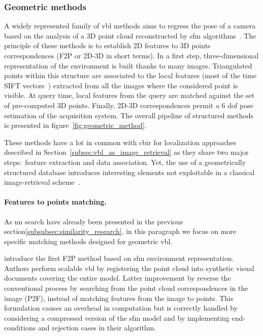 \subsubsection{Geometric methods}


\label{subsubsec:sfm_methods}
A widely represented family of \ac{vbl} methods aims to regress the pose of a camera based on the analysis of a 3D point cloud reconstructed by \ac{sfm} algorithms~\citep{schoenberger2016sfm,moulon2016openmvg,rupnik2017micmac}. The principle of these methods is to establish 2D features to 3D points correspondences (F2P or 2D-3D in short terms). In a first step, three-dimensional representation of the environment is built thanks to many images. Triangulated points within this structure are associated to the local features (most of the time SIFT vectors~\citep{Lowe2004}) extracted from all the images where the considered point is visible. At query time, local features from the query are matched against the set of pre-computed 3D points. Finally, 2D-3D correspondences permit a 6 \ac{dof} pose estimation of the acquisition system. The overall pipeline of structured methods is presented in figure~\ref{fig:geometric_method}.

These methods have a lot in common with \ac{cbir} for localization approaches described in Section~\ref{subsec:vbl_as_image_retrieval} as they share two major steps:~feature extraction and data association. Yet, the use of a geometrically structured database introduces interesting elements not exploitable in a classical image-retrieval scheme~\citep{Sattler2012a}.

\paragraph{Features to points matching.}
As \ac{nn} search have already been presented in the previous section\ref{subsubsec:similarity_research}, in this paragraph we focus on more specific matching methods designed for geometric \ac{vbl}.

\citet{Irschara2009} introduce the first F2P method based on \ac{sfm} environment representation. Authors perform scalable \ac{vbl} by registering the point cloud into synthetic visual documents covering the entire model. Latter improvement by \citet{Li2010} reverse the conventional process by searching from the point cloud correspondences in the image (P2F), instead of matching features from the image to points. This formulation causes an overhead in computation but is correctly handled by considering a compressed version of the \ac{sfm} model and by implementing end-conditions and rejection cases in their algorithm.

